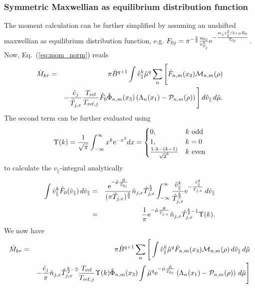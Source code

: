 \subsubsection{Symmetric Maxwellian as equilibrium distribution function}
The moment calculation can be further simplified by assuming an unshifted maxwellian
as equilibrium distribution function, e.g. 
$F_{0j}=\pi^{-\frac{3}{2}} \frac{n_{0j}}{v_{T_j}^3}{\rm e}^{-\frac{m_jv_\parallel^2/2+\mu B_0}{T_{0j}}}$.
Now, Eq.~(\ref{eq:mom_norm}) reads
\begin{eqnarray}
\hat{M}_{kr} & = & \pi\hat{B}^{q+1}
   \int \hat{v}_\|^k \hat{\mu}^q \sum_n \Bigg[
     \hat{F}_{n,m}(x_3)\mathcal{M}_{n,m}(\rho)\nonumber \\
      &&-\frac{\hat{e}_j}{\hat{T}_{j,x}}\frac{T_{\mathrm{ref}}}{T_{\mathrm{ref},j}}\hat{F}_0
     \hat{\Phi}_{n,m}(x_3)\left(
       \Lambda_n(x_1)-\mathcal{P}_{n,m}(\rho)
     \right)
   \Bigg]\,d\hat{v}_\|\,d\hat{\mu}. \nonumber
\end{eqnarray}
The second term can be further evaluated using 
\begin{eqnarray*}
\Upsilon(k)=\frac{1}{\sqrt{\pi}}\int_{-\infty}^{\infty}x^k {\rm e}^{-x^2} dx =
\begin{cases} 
0, & k \mbox{ odd} \\ 
1, & k=0 \\
\frac{1\cdot3\cdots(k-1)}{\sqrt{2}^k} & k \mbox{ even}
\end{cases}
\end{eqnarray*}
to calculate the $v_\parallel$-integral analytically
\begin{eqnarray*}
\int \hat{v}^k_\| \hat{F}_0(\hat{v}_\|)\,d\hat{v}_\|
& = & \frac{{\rm e}^{-\hat{\mu}\frac{\hat{B}}{\hat{T}_{0j}}}}
  {(\pi \hat{T}_{j,x})^{\frac{3}{2}}} \hat{n}_{j,x} \hat{T}_{j,x}^{\frac{k}{2}}
  \int_{-\infty}^{\infty}\frac{\hat{v}^k_\|}{\hat{T}_{j,x}^{\frac{k}{2}}} {\rm e}^{-\frac{\hat{v}^2_\|}
  {\hat{T}_{j,x}}}\,d\hat{v}_\| \nonumber \\
& = & \frac{1}{\pi} {\rm e}^{-\hat{\mu}\frac{\hat{B}}{\hat{T}_{j,x}}} 
  \hat{n}_{j,x} \hat{T}_{j,x}^{\frac{k}{2}-1} \Upsilon(k).
\end{eqnarray*}
We now have
\begin{eqnarray}
\hat{M}_{kr} & = & \pi\hat{B}^{q+1}  \sum_n \Bigg[
   \int \hat{v}_\|^k \hat{\mu}^q
     \hat{F}_{n,m}(x_3)\mathcal{M}_{n,m}(\rho)\,d\hat{v}_\|\,d\hat{\mu} \nonumber \\
      &&-\frac{\hat{e}_j}{\pi} \hat{n}_{j,x} \hat{T}_{j,x}^{\frac{k}{2}-2}\frac{T_{\mathrm{ref}}}{T_{\mathrm{ref},j}} 
      \Upsilon(k) \hat{\Phi}_{n,m}(x_3) 
      \int \hat{\mu}^q {\rm e}^{-\hat{\mu}\frac{\hat{B}}{\hat{T}_{0j}}} 
     \left(\Lambda_n(x_1)-\mathcal{P}_{n,m}(\rho)
     \right)\,d\hat{\mu}\Bigg] \nonumber
\end{eqnarray}
